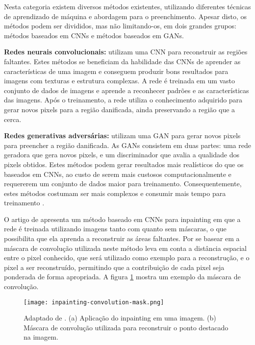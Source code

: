 Nesta categoria existem diversos métodos existentes, utilizando diferentes técnicas de aprendizado de máquina e abordagem para o preenchimento. Apesar disto, os métodos podem ser divididos, mas não limitando-os, em dois grandes grupos: métodos baseados em CNNs e métodos baseados em GANs.

\begin{list}{}{}
\item \textbf{Redes neurais convolucionais:} \label{cnn-based-learning}
utilizam uma CNN para reconstruir as regiões faltantes. Estes métodos se beneficiam da habilidade das CNNs de aprender as características de uma imagem e conseguem produzir bons resultados para imagens com texturas e estrutura complexas. A rede é treinada em um vasto conjunto de dados de imagens e aprende a reconhecer padrões e as características das imagens. Após o treinamento, a rede utiliza o conhecimento adquirido para gerar novos pixels para a região danificada, ainda preservando a região que a cerca.

\item \textbf{Redes generativas adversárias:} \label{gan-based-learning}
utilizam uma GAN para gerar novos pixels para preencher a região danificada. As GANs consistem em duas partes: uma rede geradora que gera novos pixels, e um discriminador que avalia a qualidade dos pixels obtidos\cite{black2020evaluation}. Estes métodos podem gerar resultados mais realísticos do que os baseados em CNNs, ao custo de serem mais custosos computacionalmente e requererem um conjunto de dados maior para treinamento. Consequentemente, estes métodos costumam ser mais complexos e consumir mais tempo para treinamento \cite{pathakCVPR16context}.

\end{list}

O artigo de \cite{ren2015shepard} apresenta um método baseado em CNNs para inpainting em que a rede é treinada utilizando imagens tanto com quanto sem máscaras, o que possibilita que ela aprenda a reconstruir as áreas faltantes. Por se basear em \cite{shepard1968two} a máscara de convolução utilizada neste método leva em conta a distância espacial entre o pixel conhecido, que será utilizado como exemplo para a reconstrução, e o pixel a ser reconstruído, permitindo que a contribuição de cada pixel seja ponderada de forma apropriada. A figura \ref{fig:inpainting-convolution-mask.png} mostra um exemplo da máscara de convolução.

\begin{figure}[ht]
\centering
\texttt{[image: inpainting-convolution-mask.png]}
\caption{Adaptado de \cite{ren2015shepard}. (a) Aplicação do inpainting em uma imagem. (b) Máscara de convolução utilizada para reconstruir o ponto destacado na imagem.}
\label{fig:inpainting-convolution-mask.png}
\end{figure}



